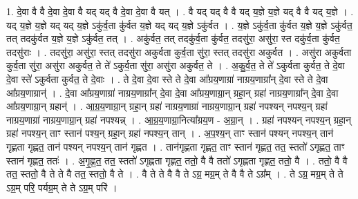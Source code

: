 \documentclass[17pt]{extarticle}
\begin{document}
1. दे॒वा वै वै दे॒वा दे॒वा वै यद् यद् वै दे॒वा दे॒वा वै यत् । . वै यद् यद् वै वै यद् य॒ज्ञे य॒ज्ञे यद् वै वै यद् य॒ज्ञे । . यद् य॒ज्ञे य॒ज्ञे यद् यद् य॒ज्ञे ऽकु॑र्व॒ता कु॑र्वत य॒ज्ञे यद् यद् य॒ज्ञे ऽकु॑र्वत । . य॒ज्ञे ऽकु॑र्व॒ता कु॑र्वत य॒ज्ञे य॒ज्ञे ऽकु॑र्वत॒ तत् तदकु॑र्वत य॒ज्ञे य॒ज्ञे ऽकु॑र्वत॒ तत् । . अकु॑र्वत॒ तत् तदकु॑र्व॒ता कु॑र्वत॒ तदसु॑रा॒ असु॑रा॒ स्त दकु॑र्व॒ता कु॑र्वत॒ तदसु॑राः । . तदसु॑रा॒ असु॑रा॒ स्तत् तदसु॑रा अकुर्वता कुर्व॒ता सु॑रा॒ स्तत् तदसु॑रा अकुर्वत । . असु॑रा अकुर्वता कुर्व॒ता सु॑रा॒ असु॑रा अकुर्वत॒ ते ते॑ ऽकुर्व॒ता सु॑रा॒ असु॑रा अकुर्वत॒ ते । . अ॒कु॒र्व॒त॒ ते ते॑ ऽकुर्वता कुर्वत॒ ते दे॒वा दे॒वा स्ते॑ ऽकुर्वता कुर्वत॒ ते दे॒वाः । . ते दे॒वा दे॒वा स्ते ते दे॒वा आ᳚ग्रय॒णाग्रा॑ नाग्रय॒णाग्रा᳚न् दे॒वा स्ते ते दे॒वा आ᳚ग्रय॒णाग्रान्॑ । . दे॒वा आ᳚ग्रय॒णाग्रा॑ नाग्रय॒णाग्रा᳚न् दे॒वा दे॒वा आ᳚ग्रय॒णाग्रा॒न् ग्रहा॒न् ग्रहा॑ नाग्रय॒णाग्रा᳚न् दे॒वा दे॒वा आ᳚ग्रय॒णाग्रा॒न् ग्रहान्॑ । . आ॒ग्र॒य॒णाग्रा॒न् ग्रहा॒न् ग्रहा॑ नाग्रय॒णाग्रा॑ नाग्रय॒णाग्रा॒न् ग्रहा॑ नपश्यन् नपश्य॒न् ग्रहा॑ नाग्रय॒णाग्रा॑ नाग्रय॒णाग्रा॒न् ग्रहा॑ नपश्यन्न् । . आ॒ग्र॒य॒णाग्रा॒नित्या᳚ग्रय॒ण - अ॒ग्रा॒न् । . ग्रहा॑ नपश्यन् नपश्य॒न् ग्रहा॒न् ग्रहा॑ नपश्य॒न् ताꣳ स्तान॑ पश्य॒न् ग्रहा॒न् ग्रहा॑ नपश्य॒न् तान् । . अ॒प॒श्य॒न् ताꣳ स्तान॑ पश्यन् नपश्य॒न् तान॑ गृह्णता गृह्णत॒ तान॑ पश्यन् नपश्य॒न् तान॑ गृह्णत । . तान॑गृह्णता गृह्णत॒ ताꣳ स्तान॑ गृह्णत॒ तत॒ स्ततो॑ ऽगृह्णत॒ ताꣳ स्तान॑ गृह्णत॒ ततः॑ । . अ॒गृ॒ह्ण॒त॒ तत॒ स्ततो॑ ऽगृह्णता गृह्णत॒ ततो॒ वै वै ततो॑ ऽगृह्णता गृह्णत॒ ततो॒ वै । . ततो॒ वै वै तत॒ स्ततो॒ वै ते ते वै तत॒ स्ततो॒ वै ते । . वै ते ते वै वै ते ऽग्र॒ मग्र॒म् ते वै वै ते ऽग्र᳚म् । . ते ऽग्र॒ मग्र॒म् ते ते ऽग्र॒म् परि॒ पर्यग्र॒म् ते ते ऽग्र॒म् परि॑ । \newline
\end{document}
